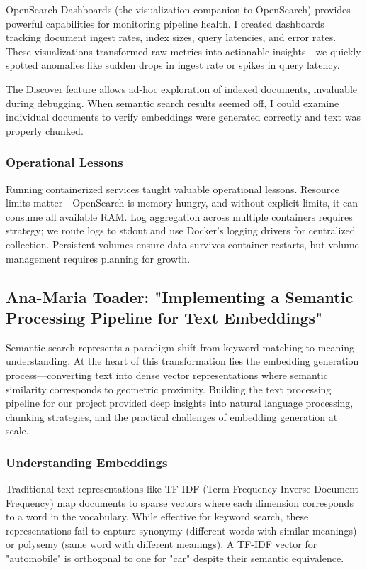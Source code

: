 \documentclass[12pt, a4paper]{article}
\begin{document}
OpenSearch Dashboards (the visualization companion to OpenSearch) provides powerful capabilities for monitoring pipeline health. I created dashboards tracking document ingest rates, index sizes, query latencies, and error rates. These visualizations transformed raw metrics into actionable insights—we quickly spotted anomalies like sudden drops in ingest rate or spikes in query latency.

The Discover feature allows ad-hoc exploration of indexed documents, invaluable during debugging. When semantic search results seemed off, I could examine individual documents to verify embeddings were generated correctly and text was properly chunked.

\subsubsection*{Operational Lessons}

Running containerized services taught valuable operational lessons. Resource limits matter—OpenSearch is memory-hungry, and without explicit limits, it can consume all available RAM. Log aggregation across multiple containers requires strategy; we route logs to stdout and use Docker's logging drivers for centralized collection. Persistent volumes ensure data survives container restarts, but volume management requires planning for growth.

\newpage
\subsection{Ana-Maria Toader: "Implementing a Semantic Processing Pipeline for Text Embeddings"}

Semantic search represents a paradigm shift from keyword matching to meaning understanding. At the heart of this transformation lies the embedding generation process—converting text into dense vector representations where semantic similarity corresponds to geometric proximity. Building the text processing pipeline for our project provided deep insights into natural language processing, chunking strategies, and the practical challenges of embedding generation at scale.

\subsubsection*{Understanding Embeddings}

Traditional text representations like TF-IDF (Term Frequency-Inverse Document Frequency) map documents to sparse vectors where each dimension corresponds to a word in the vocabulary. While effective for keyword search, these representations fail to capture synonymy (different words with similar meanings) or polysemy (same word with different meanings). A TF-IDF vector for "automobile" is orthogonal to one for "car" despite their semantic equivalence.
\end{document}
